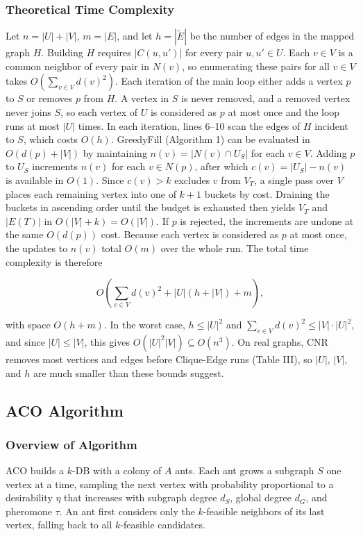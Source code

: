 \documentclass[conference]{IEEEtran}
\begin{document}
\subsubsection{Theoretical Time Complexity} Let $n = |U| + |V|$, $m = |E|$, and let $h = |\tilde{E}|$ be the number of edges in the mapped graph $H$. Building $H$ requires $|C(u,u')|$ for every pair $u,u' \in U$. Each $v \in V$ is a common neighbor of every pair in $N(v)$, so enumerating these pairs for all $v \in V$ takes $O(\sum_{v \in V} d(v)^2)$. Each iteration of the main loop either adds a vertex $p$ to $S$ or removes $p$ from $H$. A vertex in $S$ is never removed, and a removed vertex never joins $S$, so each vertex of $U$ is considered as $p$ at most once and the loop runs at most $|U|$ times. In each iteration, lines 6–10 scan the edges of $H$ incident to $S$, which costs $O(h)$. GreedyFill (Algorithm 1) can be evaluated in $O(d(p) + |V|)$ by maintaining $n(v) = |N(v) \cap U_S|$ for each $v \in V$. Adding $p$ to $U_S$ increments $n(v)$ for each $v \in N(p)$, after which $c(v) = |U_S| - n(v)$ is available in $O(1)$. Since $c(v) > k$ excludes $v$ from $V_T$, a single pass over $V$ places each remaining vertex into one of $k+1$ buckets by cost. Draining the buckets in ascending order until the budget is exhausted then yields $V_T$ and $|E(T)|$ in $O(|V| + k) = O(|V|)$. If $p$ is rejected, the increments are undone at the same $O(d(p))$ cost. Because each vertex is considered as $p$ at most once, the updates to $n(v)$ total $O(m)$ over the whole run. The total time complexity is therefore

$$
O\left(\sum_{v \in V} d(v)^2 + |U|(h + |V|) + m\right),
$$

with space $O(h + m)$. In the worst case, $h \leq |U|^2$ and $\sum_{v \in V} d(v)^2 \leq |V| \cdot |U|^2$, and since $|U| \leq |V|$, this gives $O(|U|^2|V|) \subseteq O(n^3)$. On real graphs, CNR removes most vertices and edges before Clique-Edge runs (Table III), so $|U|$, $|V|$, and $h$ are much smaller than these bounds suggest.

\subsection{ACO Algorithm}

\subsubsection{Overview of Algorithm}

ACO builds a $k$-DB with a colony of $A$ ants. Each ant grows a subgraph $S$ one vertex at a time, sampling the next vertex with probability proportional to a desirability $\eta$ that increases with subgraph degree $d_S$, global degree $d_G$, and pheromone $\tau$. An ant first considers only the $k$-feasible neighbors of its last vertex, falling back to all $k$-feasible candidates.
\end{document}
